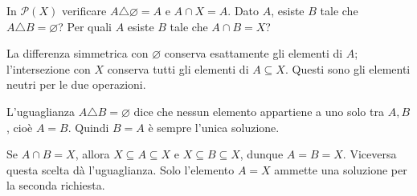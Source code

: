 \begin{esercizio}
In $\mathcal P(X)$ verificare $A\triangle\varnothing=A$ e $A\cap X=A$. Dato $A$, esiste $B$ tale che $A\triangle B=\varnothing$? Per quali $A$ esiste $B$ tale che $A\cap B=X$?
\end{esercizio}
\begin{svolgimento}
La differenza simmetrica con $\varnothing$ conserva esattamente gli elementi di $A$; l'intersezione con $X$ conserva tutti gli elementi di $A\subseteq X$. Questi sono gli elementi neutri per le due operazioni.

L'uguaglianza $A\triangle B=\varnothing$ dice che nessun elemento appartiene a uno solo tra $A,B$, cioè $A=B$. Quindi $B=A$ è sempre l'unica soluzione.

Se $A\cap B=X$, allora $X\subseteq A\subseteq X$ e $X\subseteq B\subseteq X$, dunque $A=B=X$. Viceversa questa scelta dà l'uguaglianza. Solo l'elemento $A=X$ ammette una soluzione per la seconda richiesta.
\end{svolgimento}
